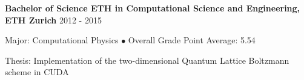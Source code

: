 
\textbf{Bachelor of Science ETH in Computational Science and Engineering, ETH Zurich} \hfill 2012 - 2015

Major: Computational Physics $\bullet$ Overall Grade Point Average: 5.54

Thesis: Implementation of the two-dimensional Quantum Lattice Boltzmann scheme in CUDA

